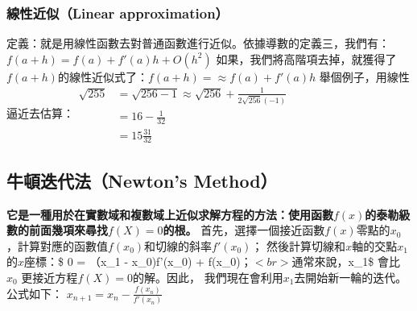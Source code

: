 \documentclass[11pt]{article}
\begin{document}
    \hypertarget{ux7ddaux6027ux8fd1ux4f3clinear-approximation}{%
\subsubsection{線性近似（Linear
approximation）}\label{ux7ddaux6027ux8fd1ux4f3clinear-approximation}}

定義：就是用線性函數去對普通函數進行近似。依據導數的定義三，我們有：\(f(a+h) = f(a) + f'(a)h + O(h^2)\)
如果，我們將高階項去掉，就獲得了\(f(a+h)\)的線性近似式了：\(f(a+h) = \approx f(a) + f'(a)h\)
舉個例子，用線性逼近去估算：\(\begin{align*} \sqrt{255} &= \sqrt {256-1} \approx \sqrt{256} + \frac{1}{2\sqrt{256}(-1)} \\ &=16-\frac{1}{32} \\ &=15 \frac{31}{32} \end{align*}\)

    \hypertarget{ux725bux9813ux8fedux4ee3ux6cd5newtons-method}{%
\subsection{牛頓迭代法（Newton's
Method）}\label{ux725bux9813ux8fedux4ee3ux6cd5newtons-method}}

\textbf{它是一種用於在實數域和複數域上近似求解方程的方法：使用函數\(f(x)\)的泰勒級數的前面幾項來尋找\(f(X)=0\)的根。}
首先，選擇一個接近函數\(f(x)\)零點的\(x_0\)，計算對應的函數值\(f(x_0)\)和切線的斜率\(f'(x_0)\)；
然後計算切線和\(x\)軸的交點\(x_1\)的\(x\)座標：\$ 0 = （x\_1 -
x\_0)\cdot f'(x\_0) + f(x\_0)\(；<br> 通常來說，\)x\_1\$ 會比 \(x_0\)
更接近方程\(f(X)=0\)的解。因此，
我們現在會利用\(x_1\)去開始新一輪的迭代。公式如下：
\(x_{n+1} = x_n - \frac{f(x_n)}{f'(x_n)}\)
\end{document}
